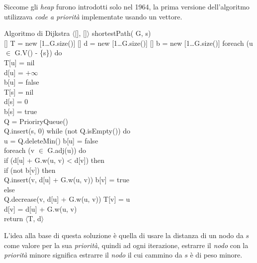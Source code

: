 \begin{note}
    Siccome gli \emph{heap} furono introdotti solo nel 1964, la prima versione
    dell'algoritmo utilizzava \emph{code a priorità} implementate usando un
    vettore.
\end{note}

\begin{minicode}{Algoritmo di Dijkstra}
\ind$\langle$[], []$\rangle$ shortestPath( G,  s)\\
    [] T = new [1\dots G.size()]\hfill{}
    [] d = new [1\dots G.size()]\hfill{}
    [] b = new [1\dots G.size()]\hfill{}
    \indf foreach (u $\in$ G.V() - \{s\}) do\\
        T[u] = nil\\
        d[u] = $+\infty$\\
        b[u] = false\\
    \indf T[s] = nil\\
    \indf d[s] = 0\\
    \indf b[s] = true\\
    \indf{} Q = PrioriryQueue()\\
    \indf Q.insert(s, 0)\hfill{}
    \indf while (not Q.isEmpty()) do\\
         u = Q.deleteMin()\hfill{}
        b[u] = false\\
        \indff foreach (v $\in$ G.adj(u)) do\\
            \indfff if (d[u] + G.w(u, v) < d[v]) then\\
                \indffff if (not b[v]) then\\
                    Q.insert(v, d[u] + G.w(u, v))\hfill{}
                    b[v] = true\\
                \indffff else\\
                    Q.decrease(v, d[u] + G.w(u, v))\hfill{}
            \indfff T[v] = u\\
            \indfff d[v] = d[u] + G.w(u, v)\\
    \indf return $\langle$T, d$\rangle$
\end{minicode}\noindent
L'idea alla base di questa soluzione è quella di usare la distanza di un nodo
da $s$ come valore per la sua \emph{priorità}, quindi ad ogni iterazione,
estrarre il \emph{nodo} con la \emph{priorità} minore significa estrarre il
\emph{nodo} il cui cammino da $s$ è di peso minore.


